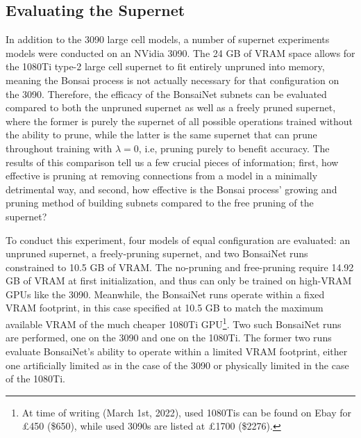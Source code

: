\subsection{Evaluating the Supernet} \label{sect:supernetevaluation}
In addition to the 3090 large cell models, a number of supernet experiments models were conducted on an NVidia 3090.
The 24 GB of VRAM space allows
for the 1080Ti type-2 large cell supernet to fit entirely unpruned into memory, meaning the Bonsai process is not actually
necessary for that configuration on the 3090. Therefore, the efficacy of the BonsaiNet subnets can be evaluated compared
to both the unpruned supernet as well as a freely pruned supernet, where the former is purely the supernet of all possible
operations trained without the ability to prune, while the latter is the same supernet that can prune throughout training with
$\lambda=0$, i.e, pruning purely to benefit accuracy. The results of this comparison tell us a few crucial pieces of information; first,
how effective is pruning at removing connections from a model in a minimally detrimental way, and second, how effective
is the Bonsai process' growing and pruning method of building subnets compared to the free pruning of the supernet?

To conduct this experiment, four models of equal configuration are evaluated: an unpruned supernet, a freely-pruning supernet, and two BonsaiNet runs
constrained to 10.5 GB of VRAM. The no-pruning and free-pruning require 14.92 GB of VRAM at first initialization, and thus can only be trained on
high-VRAM GPUs like the 3090.  Meanwhile, the BonsaiNet
runs operate within a fixed VRAM footprint, in this case specified at 10.5 GB to match the maximum available VRAM of the much cheaper 1080Ti GPU\footnote{At time of writing (March 1st, 2022), used 1080Tis
can be found on Ebay for \pounds450 (\$650), while used 3090s are listed at \pounds1700 (\$2276).}.
Two such BonsaiNet runs are performed, one on the 3090 and one on the 1080Ti. The former two runs evaluate BonsaiNet's ability
to operate within a limited VRAM footprint, either one artificially limited as in the case of the 3090 or physically limited
in the case of the 1080Ti.

